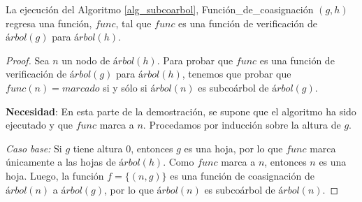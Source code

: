 \begin{theorem}
    La ejecución del Algoritmo \ref{alg_subcoarbol}, Función\_de\_coasignación $(g, h)$ regresa una función, $func$, tal que $func$ es una función de verificación de $árbol(g)$ para $árbol(h)$.
\end{theorem}

\begin{proof}

    Sea $n$ un nodo de $árbol(h)$. Para probar que $func$ es una función de verificación de $árbol(g)$ para $árbol(h)$, tenemos que probar que $func(n) = marcado$ si y sólo si $árbol(n)$ es subcoárbol de $árbol(g)$.

    \textbf{Necesidad}: En esta parte de la demostración, se supone que el algoritmo ha sido ejecutado y que $func$ marca a $n$. Procedamos por inducción sobre la altura de $g$.

    \emph{Caso base:} Si $g$ tiene altura 0, entonces $g$ es una hoja, por lo que $func$ marca únicamente a las hojas de $árbol(h)$. Como $func$ marca a $n$, entonces $n$ es una hoja. Luego, la función $f=\{(n,g)\}$ es una función de coasignación de $árbol(n)$ a $árbol(g)$, por lo que $árbol(n)$ es subcoárbol de $árbol(n)$.


\end{proof}
